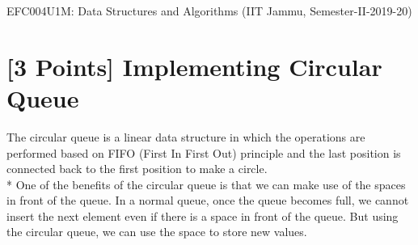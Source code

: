 \documentclass[14pt]{article}
\begin{document}
\large
EFC004U1M: Data Structures and Algorithms (IIT Jammu, Semester-II-2019-20)

\begin{myframe}[width=500pt,height=40pt,top=10pt,bottom=10pt,left=10pt,right=10pt,arc=10pt,auto outer arc]
\Large {}
\end{myframe}

\section{[3 Points] Implementing Circular Queue}
The circular queue is a linear data structure in which the operations are performed based on FIFO (First In First Out) principle and the last position is connected back to the first position to make a circle. \\*
One of the benefits of the circular queue is that we can make use of the spaces in front of the queue. In a normal queue, once the queue becomes full, we cannot insert the next element even if there is a space in front of the queue. But using the circular queue, we can use the space to store new values.
\end{document}
